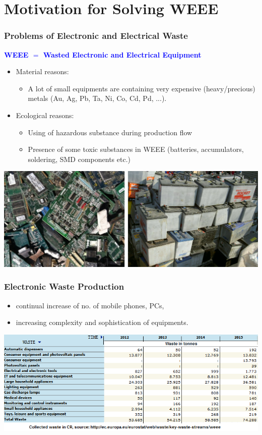 \documentclass{beamer}
\begin{document}
\section{\texorpdfstring{Motivation for Solving WEEE}{Motivation for Solving WEEE}}
	\begin{frame}
    \frametitle{Problems of Electronic and Electrical Waste}
		
		\textcolor{blue}{\textbf{WEEE $=$ Wasted Electronic and Electrical Equipment}}
		\begin{itemize}
			\item Material reasons:
			\begin{itemize}
				\item A lot of small equipments are containing very expensive (heavy/precious) metals (Au, Ag, Pb, Ta, Ni, Co, Cd, Pd, ...).
			\end{itemize}
			\item Ecological reasons:
			\begin{itemize}
				\item Using of hazardous substance during production flow
				\item Presence of some toxic substances in WEEE (batteries, accumulators, soldering, SMD components etc.)
			\end{itemize}
		\end{itemize}
		\begin{center}
			\includegraphics[width=0.65\linewidth]{obr09_elektroABaterie.png}
		\end{center}
	\end{frame}
	\begin{frame}
    \frametitle{Electronic Waste Production}
		
		\begin{itemize}
			\item continual increase of no. of mobile phones, PCs,
			\item increasing complexity and sophistication of equipments.
		\end{itemize}
		\begin{center}
				\includegraphics[scale=0.55]{obr05_elektroodpad.png}
		\end{center}
	\end{frame}
\end{document}
